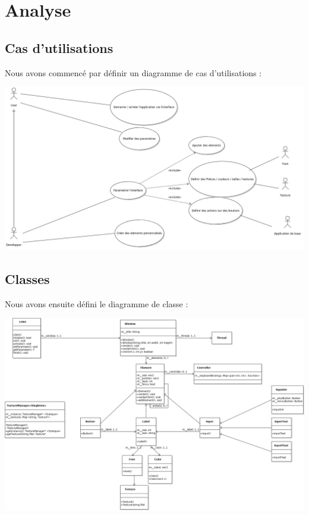 \documentclass[a4paper]{report}
\begin{document}
\chapter{Analyse}

    \section{Cas d'utilisations}

    Nous avons commencé par définir un diagramme de cas d'utilisations :
\begin{center}
    \includegraphics[scale=0.3]{Analyse/UseCase.png}
\end{center}

    \section{Classes}

    Nous avons ensuite défini le diagramme de classe :
\begin{center}
    \includegraphics[scale=0.3]{Analyse/Classes.png}
\end{center}
\end{document}
